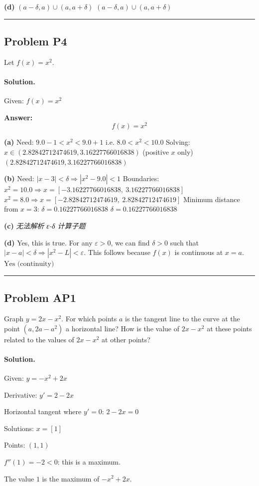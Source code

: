 \documentclass[12pt, a4paper]{article}
\newcommand{\problem}[1]{\subsection*{Problem #1}}
\newcommand{\solution}{\paragraph{Solution.}}
\begin{document}
\textbf{(d)}
$(a - \delta, a) \cup (a, a + \delta)$
$\boxed{(a - \delta, a) \cup (a, a + \delta)}$

\vspace{1em}
\hrule
\vspace{1em}

\problem{P4}

Let $f(x) = x^2$.

\solution

Given: $f(x) = x^{2}$

\textbf{Answer:}
\[\boxed{f(x) = x^{2}}\]

\textbf{(a)}
Need: $9.0 - 1 < x^{2} < 9.0 + 1$
i.e. $8.0 < x^{2} < 10.0$
Solving: $x \in (2.82842712474619, 3.16227766016838)$ (positive $x$ only)
$\boxed{(2.82842712474619, 3.16227766016838)}$

\textbf{(b)}
Need: $|x - 3| < \delta \Rightarrow |x^{2} - 9.0| < 1$
Boundaries: $x^{2} = 10.0 \Rightarrow x = \left[ -3.16227766016838, \  3.16227766016838\right]$
           $x^{2} = 8.0 \Rightarrow x = \left[ -2.82842712474619, \  2.82842712474619\right]$
Minimum distance from $x = 3$: $\delta = 0.16227766016838$
$\boxed{\delta = 0.16227766016838}$

\textbf{(c)}
\textit{\color{red} 无法解析 ε-δ 计算子题}

\textbf{(d)}
Yes, this is true.
For any $\varepsilon > 0$, we can find $\delta > 0$ such that
$|x - a| < \delta \Rightarrow |x^{2} - L| < \varepsilon$.
This follows because $f(x)$ is continuous at $x = a$.
$\boxed{\text{Yes (continuity)}}$

\vspace{1em}
\hrule
\vspace{1em}

\problem{AP1}

Graph $y = 2x - x^2$. For which points $a$ is the tangent line to the curve at the point $(a, 2a - a^2)$ a horizontal line? How is the value of $2x - x^2$ at these points related to the values of $2x - x^2$ at other points?

\solution

Given: $y = - x^{2} + 2 x$

Derivative: $y' = 2 - 2 x$

Horizontal tangent where $y' = 0$: $2 - 2 x = 0$

Solutions: $x = \left[ 1\right]$

Points: $(1, 1)$

$f''(1) = -2 < 0$: this is a maximum.

The value $1$ is the maximum of $- x^{2} + 2 x$.
\end{document}
